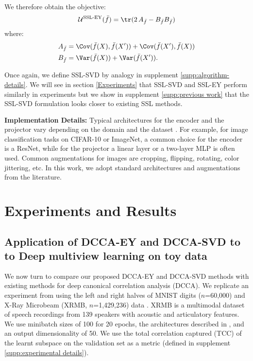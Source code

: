 We therefore obtain the objective:
\begin{align}\label{eq:SSL-EY}
    \mathcal{U}^\text{SSL-EY}(\bar{f}) =\tr( 2 \, A_{\bar{f}} - B_{\bar{f}} B_{\bar{f}})
\end{align}
where:
\begin{align*}
    A_{\bar{f}}
    &= \Cov(\bar{f}(X),\bar{f}(X')) + \Cov(\bar{f}(X'),\bar{f}(X)) \\
    B_{\bar{f}} 
    &= \Var(\bar{f}(X)) + \Var(\bar{f}(X')).
\end{align*}

Once again, we define SSL-SVD by analogy in supplement \ref{supp:algorithm-details}. We will see in section \ref{Experiments} that SSL-SVD and SSL-EY perform similarly in experiments but we show in supplement \ref{supp:previous work} that the SSL-SVD formulation looks closer to existing SSL methods.

\textbf{Implementation Details:} Typical architectures for the encoder and the projector vary depending on the domain and the dataset \cite{balestriero2023cookbook}. For example, for image classification tasks on CIFAR-10 or ImageNet, a common choice for the encoder is a ResNet, while for the projector a linear layer or a two-layer MLP is often used. Common augmentations for images are cropping, flipping, rotating, color jittering, etc. In this work, we adopt standard architectures and augmentations from the literature.


\section{Experiments and Results}

\subsection{Application of DCCA-EY and DCCA-SVD to to Deep multiview learning on toy data}

We now turn to compare our proposed DCCA-EY and DCCA-SVD methods with existing methods for deep canonical correlation analysis (DCCA). We replicate an experiment from \cite{wang2015stochastic} using the left and right halves of MNIST \cite{lecun1998gradient} digits ($n$=60,000) and X-Ray Microbeam (XRMB, $n$=1,429,236) data \cite{westbury1994x}. XRMB is a multimodal dataset of speech recordings from 139 speakers with acoustic and articulatory features. We use minibatch sizes of 100 for 20 epochs, the architectures described in \cite{wang2015stochastic}, and an output dimensionality of 50.  We use the total correlation captured (TCC) of the learnt subspace on the validation set as a metric (defined in supplement \ref{supp:experimental details}).

